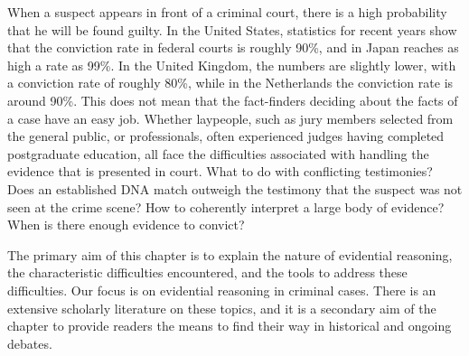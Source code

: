 \documentclass[10pt]{article}
\begin{document}
\noindent When a suspect appears in front of a criminal court, there is a high probability that he will be found guilty. 
In the United States, statistics for recent years show that the conviction rate in federal courts is roughly 90\%, and in Japan reaches as high a rate as 99\%. 
In the United Kingdom, the numbers are slightly lower, with a conviction rate of roughly 80\%, while in the Netherlands 
the conviction rate is around 90\%. 
This does not mean that the fact-finders deciding about the facts of a case have an easy job. Whether laypeople, such as jury members selected from the general public, or professionals, often experienced judges having completed postgraduate education, all face the difficulties associated with handling the evidence that is presented in court. What to do with conflicting testimonies? Does an established DNA match outweigh the testimony that the suspect was not seen at the crime scene? How to coherently interpret a large body of evidence? 
When is there enough evidence to convict? %

The primary aim of this chapter is to explain the nature of evidential reasoning, the characteristic difficulties encountered, and the tools to address these difficulties. 
Our focus is on evidential reasoning in criminal cases. There is an extensive scholarly literature on these topics, 
and it is a secondary aim of the chapter to provide readers the means to find their way in historical and ongoing debates. 
\end{document}
